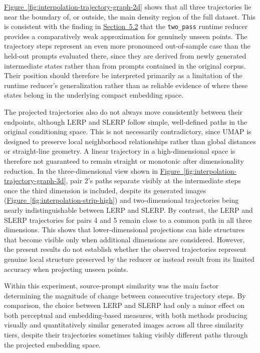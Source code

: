 \hyperref[fig:interpolation-trajectory-graph-2d]{Figure~\ref*{fig:interpolation-trajectory-graph-2d}} shows that all three trajectories lie near the boundary of, or outside, the main density region of the full dataset. This is consistent with the finding in \hyperref[sec:5.2]{Section~5.2} that the \texttt{two\_pass} runtime reducer provides a comparatively weak approximation for genuinely unseen points. The trajectory steps represent an even more pronounced out-of-sample case than the held-out prompts evaluated there, since they are derived from newly generated intermediate states rather than from prompts contained in the original corpus. Their position should therefore be interpreted primarily as a limitation of the runtime reducer's generalization rather than as reliable evidence of where these states belong in the underlying compact embedding space.

The projected trajectories also do not always move consistently between their endpoints, although LERP and SLERP follow simple, well-defined paths in the original conditioning space. This is not necessarily contradictory, since UMAP is designed to preserve local neighborhood relationships rather than global distances or straight-line geometry. A linear trajectory in a high-dimensional space is therefore not guaranteed to remain straight or monotonic after dimensionality reduction.
In the three-dimensional view shown in \hyperref[fig:interpolation-trajectory-graph-3d]{Figure~\ref*{fig:interpolation-trajectory-graph-3d}}, pair 2's paths separate visibly at the intermediate steps once the third dimension is included, despite its generated images (\hyperref[fig:interpolation-strip-high]{Figure~\ref*{fig:interpolation-strip-high}}) and two-dimensional trajectories being nearly indistinguishable between LERP and SLERP. By contrast, the LERP and SLERP trajectories for pairs 4 and 5 remain close to a common path in all three dimensions. This shows that lower-dimensional projections can hide structures that become visible only when additional dimensions are considered. However, the present results do not establish whether the observed trajectories represent genuine local structure preserved by the reducer or instead result from its limited accuracy when projecting unseen points.

Within this experiment, source-prompt similarity was the main factor determining the magnitude of change between consecutive trajectory steps. By comparison, the choice between LERP and SLERP had only a minor effect on both perceptual and embedding-based measures, with both methods producing visually and quantitatively similar generated images across all three similarity tiers, despite their trajectories sometimes taking visibly different paths through the projected embedding space.

